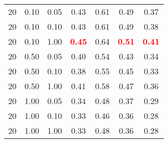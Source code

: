 \begin{tabular}{lllcccc}
20 & 0.10 & 0.05 & 0.43 & 0.61 & 0.49 & 0.37 \\ 
20 & 0.10 & 0.10 & 0.43 & 0.61 & 0.49 & 0.38 \\ 
20 & 0.10 & 1.00 & \textbf{\textcolor{red}{0.45}} & 0.64 & \textbf{\textcolor{red}{0.51}} & \textbf{\textcolor{red}{0.41}} \\ 
20 & 0.50 & 0.05 & 0.40 & 0.54 & 0.43 & 0.34 \\ 
20 & 0.50 & 0.10 & 0.38 & 0.55 & 0.45 & 0.33 \\ 
20 & 0.50 & 1.00 & 0.41 & 0.58 & 0.47 & 0.36 \\ 
20 & 1.00 & 0.05 & 0.34 & 0.48 & 0.37 & 0.29 \\ 
20 & 1.00 & 0.10 & 0.33 & 0.46 & 0.36 & 0.28 \\ 
20 & 1.00 & 1.00 & 0.33 & 0.48 & 0.36 & 0.28 \\ 
\end{tabular} 
